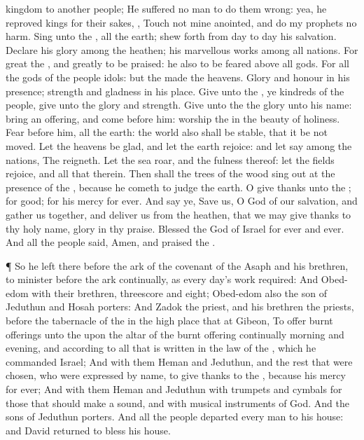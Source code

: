 {{}
kingdom to
another
people;
He
suffered no
man to do them
wrong: yea, he
reproved
kings for their sakes,
,
Touch not mine
anointed, and do my
prophets no
harm.
Sing unto the
{}, all the
earth; shew
forth from
day to
day his
salvation.
Declare his
glory among the
heathen; his marvellous
works among all
nations.
For
great
{} the
{}, and
greatly to be
praised: he also
{} to be
feared above all
gods.
For all the
gods of the
people
{}
idols: but the
{}
made the
heavens.
Glory and
honour
{} in his
presence;
strength and
gladness
{} in his
place.
Give unto the
{}, ye
kindreds of the
people,
give unto the
{}
glory and
strength.
Give unto the
{} the
glory
{} unto his
name:
bring an
offering, and
come
before him:
worship the
{} in the
beauty of
holiness.
Fear
before him, all the
earth: the
world also shall be
stable, that it be not
moved.
Let the
heavens be
glad, and let the
earth
rejoice: and let
{}
say among the
nations, The
{}
reigneth.
Let the
sea
roar, and the
fulness thereof: let the
fields
rejoice, and all that
{} therein.
Then shall the
trees of the
wood sing
out at the
presence of the
{}, because he
cometh to
judge the
earth.
O give
thanks unto the
{}; for
{}
good; for his
mercy
{} for
ever.
And
say ye,
Save us, O
God of our
salvation, and gather us
together, and
deliver us from the
heathen, that we may give
thanks to thy
holy
name,
{}
glory in thy
praise.
Blessed
{} the
{}
God of
Israel for
ever and
ever. And all the
people
said,
Amen, and
praised the
{}.
\par }{\PP {}¶ So he
left there
before the
ark of the
covenant of the
{}
Asaph and his
brethren, to
minister
before the
ark
continually, as every
day’s
work
required:
And
Obed-edom with their
brethren,
threescore and
eight;
Obed-edom also the
son of
Jeduthun and
Hosah
{}
porters:
And
Zadok the
priest, and his
brethren the
priests,
before the
tabernacle of the
{} in the high
place that
{} at
Gibeon,
To
offer burnt
offerings unto the
{} upon the
altar of the burnt
offering
continually
morning and
evening, and
{} according to all that is
written in the
law of the
{}, which he
commanded
Israel;
And with them
Heman and
Jeduthun, and the
rest that were
chosen, who were
expressed by
name, to give
thanks to the
{}, because his
mercy
{} for
ever;
And with them
Heman and
Jeduthun with
trumpets and
cymbals for those that should make a
sound, and with
musical
instruments of
God. And the
sons of
Jeduthun
{}
porters.
And all the
people
departed every
man to his
house: and
David
returned to
bless his
house.

}
